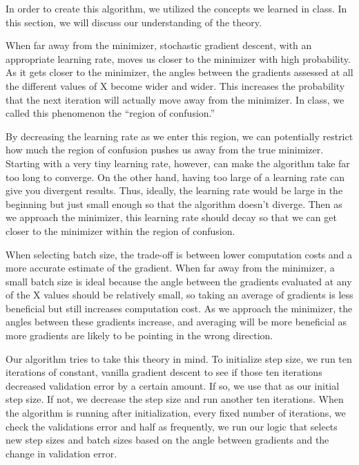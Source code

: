 \documentclass{article}
\begin{document}
\par In order to create this algorithm, we utilized the concepts we learned in class. In this section, we will discuss our understanding of the theory. 
\par When far away from the minimizer, stochastic gradient descent, with an appropriate learning rate, moves us closer to the minimizer with high probability. As it gets closer to the minimizer, the angles between the gradients assessed at all the different values of X become wider and wider. This increases the probability that the next iteration will actually move away from the minimizer. In class, we called this phenomenon the ``region of confusion.''
\par By decreasing the learning rate as we enter this region, we can potentially restrict how much the region of confusion pushes us away from the true minimizer. Starting with a very tiny learning rate, however, can make the algorithm take far too long to converge. On the other hand, having too large of a learning rate can give you divergent results. Thus, ideally, the learning rate would be large in the beginning but just small enough so that the algorithm doesn't diverge. Then as we approach the minimizer, this learning rate should decay so that we can get closer to the minimizer within the region of confusion. 
\par When selecting batch size, the trade-off is between lower computation costs and a more accurate estimate of the gradient. When far away from the minimizer, a small batch size is ideal because the angle between the gradients evaluated at any of the X values should be relatively small, so taking an average of gradients is less beneficial but still increases computation cost. As we approach the minimizer, the angles between these gradients increase, and averaging will be more beneficial as more gradients are likely to be pointing in the wrong direction. 
\par Our algorithm tries to take this theory in mind. To initialize step size, we run ten iterations of constant, vanilla gradient descent to see if those ten iterations decreased validation error by a certain amount. If so, we use that as our initial step size. If not, we decrease the step size and run another ten iterations. When the algorithm is running after initialization, every fixed number of iterations, we check the validations error and half as frequently, we run our logic that selects new step sizes and batch sizes based on the angle between gradients and the change in validation error.
\end{document}
